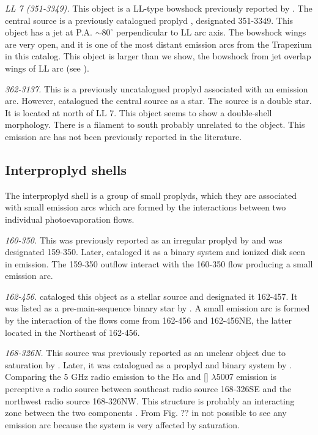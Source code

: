 \documentclass[iop, apj]{emulateapj}
\newcommand\oiii{[\ion{O}{3}]}
\newcommand\ha{\ensuremath{\mathrm{H\alpha}}}
\renewcommand\clearpage{}
\begin{document}
\textit{LL 7 (351-3349).} This object is a LL-type bowshock previously reported by \citet{Bally:2001a}. The central source is a previously catalogued proplyd \citep{Ricci:2008a}, designated 351-3349. This object has a jet at P.A. $\sim 80^{\circ}$ perpendicular to LL arc axis. The  bowshock  wings are very open, and it is one of the most distant emission arcs from the Trapezium in this catalog. This object is larger than we show, the bowshock from jet overlap wings of LL arc (see \citealp{Bally:2001a}).   

\textit{362-3137.} This is a previously uncatalogued proplyd associated with an emission arc. However, \citet{Da-Rio:2009a} catalogued the central source as a star. The source is a double star. It is located at north of LL 7. This object seems to show a double-shell morphology. There is a filament to south probably unrelated to the object. This emission arc has not been previously reported in the literature.  

\clearpage
\subsection{Interproplyd shells}
\label{sec:interproplyd-group}



The interproplyd shell is a  group of small proplyds, which they are associated with small emission arcs which are formed by the interactions between two individual photoevaporation flows.
    
\textit{160-350.} This was previously reported as an irregular proplyd by \citet{Odell:1994} and was designated 159-350. Later, \citet{Ricci:2008a} cataloged it as a binary system and ionized disk seen in emission. The 159-350 outflow interact with the 160-350 flow producing a small emission arc.  

\textit{162-456.} \citet{ODell:1996a} cataloged this object as a stellar source and designated it 162-457. It was listed as a pre-main-sequence binary star by \citet{Reipurth:2007}. A small emission arc is formed by the interaction of the flows come from 162-456 and 162-456NE, the latter located in the Northeast of 162-456.     

\textit{168-326N.} This source was previously reported as an unclear object due to saturation by \citet{Odell:1994}. Later, it was catalogued as a proplyd and binary system by \citet{Ricci:2008a}. Comparing the 5 GHz radio emission to the \ha{} and \oiii{} $\lambda$5007 emission is perceptive a radio source between southeast radio source 168-326SE and the northwest radio source 168-326NW. This structure is probably an interacting zone between the two components \citep{Graham:2002}. From Fig. ?? in not possible to see any emission arc because the system is very affected by saturation.    
\end{document}
